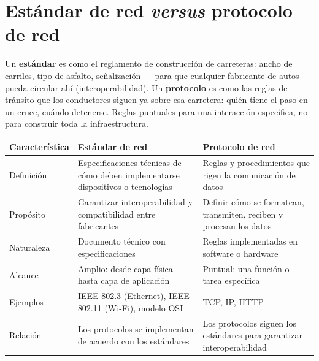 \documentclass[11pt,a4paper]{article}
\begin{document}
\newpage
\section{Estándar de red \textit{versus} protocolo de red}

\begin{analogybox}
Un \textbf{estándar} es como el reglamento de construcción de carreteras: ancho de carriles, tipo de asfalto, señalización --- para que cualquier fabricante de autos pueda circular ahí (interoperabilidad). Un \textbf{protocolo} es como las reglas de tránsito que los conductores siguen ya sobre esa carretera: quién tiene el paso en un cruce, cuándo detenerse. Reglas puntuales para una interacción específica, no para construir toda la infraestructura.
\end{analogybox}

\begin{center}
\small
\begin{tabularx}{\textwidth}{@{}l X X@{}}
\toprule
\textbf{Característica} & \textbf{Estándar de red} & \textbf{Protocolo de red} \\
\midrule
Definición & Especificaciones técnicas de cómo deben implementarse dispositivos o tecnologías & Reglas y procedimientos que rigen la comunicación de datos \\
Propósito & Garantizar interoperabilidad y compatibilidad entre fabricantes & Definir cómo se formatean, transmiten, reciben y procesan los datos \\
Naturaleza & Documento técnico con especificaciones & Reglas implementadas en software o hardware \\
Alcance & Amplio: desde capa física hasta capa de aplicación & Puntual: una función o tarea específica \\
Ejemplos & IEEE 802.3 (Ethernet), IEEE 802.11 (Wi-Fi), modelo OSI & TCP, IP, HTTP \\
Relación & Los protocolos se implementan de acuerdo con los estándares & Los protocolos siguen los estándares para garantizar interoperabilidad \\
\bottomrule
\end{tabularx}
\end{center}
\end{document}
